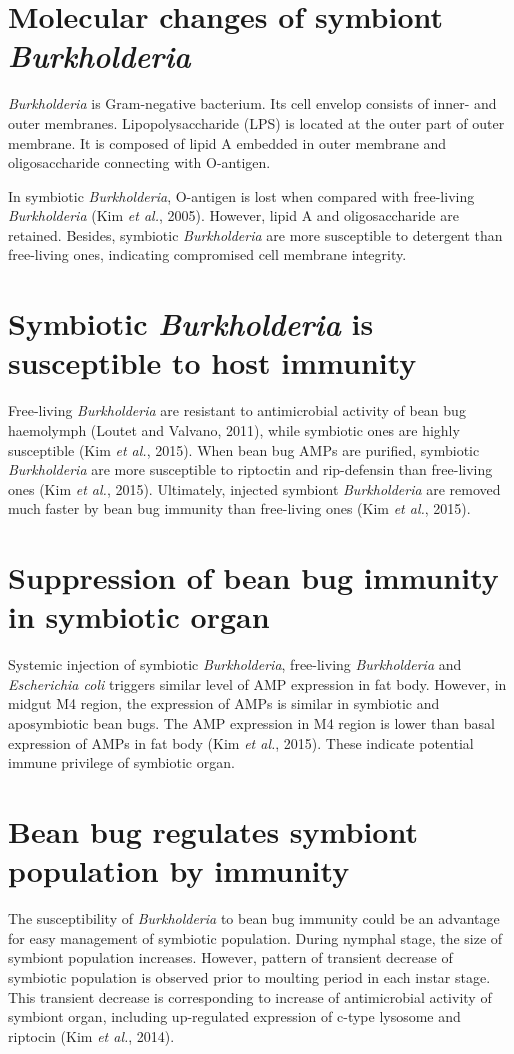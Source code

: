 \documentclass[11pt]{article}
\begin{document}
\section{Molecular changes of symbiont \textit{Burkholderia}}
\textit{Burkholderia} is Gram-negative bacterium. 
Its cell envelop consists of inner- and outer membranes. 
Lipopolysaccharide (LPS) is located at the outer part of outer membrane. 
It is composed of lipid A embedded in outer membrane and oligosaccharide connecting with O-antigen. 

\newline

In symbiotic \textit{Burkholderia}, O-antigen is lost when compared with free-living \textit {Burkholderia} (Kim \textit{et al.}, 2005). 
However, lipid A and oligosaccharide are retained. 
Besides, symbiotic \textit{Burkholderia} are more susceptible to detergent than free-living ones, indicating compromised cell membrane integrity.

\section{Symbiotic \textit{Burkholderia} is susceptible to host immunity}
Free-living \textit{Burkholderia} are resistant to antimicrobial activity of bean bug haemolymph (Loutet and Valvano, 2011), while symbiotic ones are highly susceptible (Kim \textit{et al.}, 2015). 
When bean bug AMPs are purified, symbiotic \textit{Burkholderia} are more susceptible to riptoctin and rip-defensin than free-living ones (Kim \textit{et al.}, 2015). 
Ultimately, injected symbiont \textit{Burkholderia} are removed much faster by bean bug immunity than free-living ones (Kim \textit{et al.}, 2015).

\section{Suppression of bean bug immunity in symbiotic organ}
Systemic injection of symbiotic \textit{Burkholderia}, free-living \textit{Burkholderia} and \textit{Escherichia coli} triggers similar level of AMP expression in fat body. 
However, in midgut M4 region, the expression of AMPs is similar in symbiotic and aposymbiotic bean bugs. 
The AMP expression in M4 region is lower than basal expression of AMPs in fat body (Kim \textit{et al.}, 2015). 
These indicate potential immune privilege of symbiotic organ. 

\section{Bean bug regulates symbiont population by immunity}
The susceptibility of \textit{Burkholderia} to bean bug immunity could be an advantage for easy management of symbiotic population. 
During nymphal stage, the size of symbiont population increases. 
However, pattern of transient decrease of symbiotic population is observed prior to moulting period in each instar stage. 
This transient decrease is corresponding to increase of antimicrobial activity of symbiont organ, including up-regulated expression of c-type lysosome and riptocin (Kim \textit{et al.}, 2014). 
\end{document}
